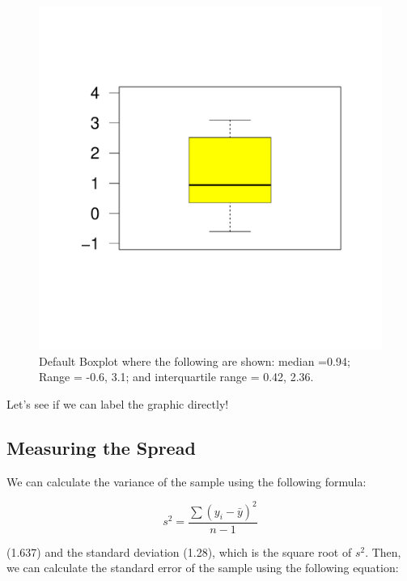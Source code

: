 \documentclass{tufte-handout}\usepackage[]{graphicx}\usepackage[]{color}
\makeatletter
\def\maxwidth{ %
  \ifdim\Gin@nat@width>\linewidth
    \linewidth
  \else
    \Gin@nat@width
  \fi
}
\newenvironment{knitrout}{}{} %
\makeatother
\begin{document}
\begin{figure}
\caption{Default Boxplot where the following are shown: median =0.94; Range = -0.6, 3.1; and interquartile range = 0.42, 2.36.}
\label{fig:default_bp}
\begin{knitrout}
\color{fgcolor}
\includegraphics[width=\maxwidth]{figure/unnamed-chunk-6-1} 

\end{knitrout}
\end{figure}

Let's see if we can label the graphic directly!


\subsection{Measuring the Spread}

We can calculate the variance of the sample using the following formula: 

\begin{equation}
s^2 = \frac{\sum(y_i - \bar{y})^2}{n-1}
\end{equation}

\noindent (1.637) and the standard deviation (1.28), which is the square root of $s^2$. Then, we can calculate the standard error of the sample using the following equation: 
\end{document}
